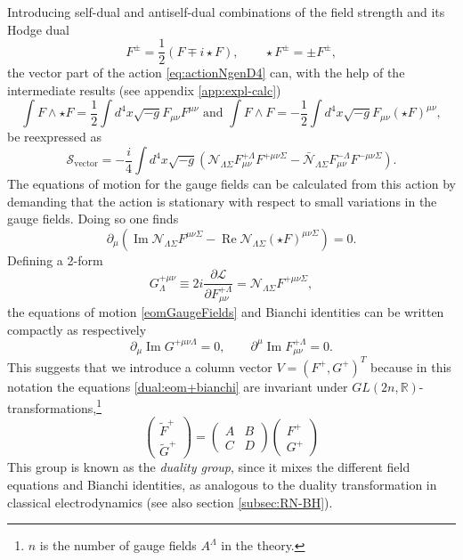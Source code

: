 \documentclass[12pt,twoside]{book}
\newcommand\real{\operatorname{Re}}
\newcommand\imag{\operatorname{Im}}
\begin{document}
Introducing self-dual and antiself-dual combinations of the field strength and its Hodge dual
\begin{equation}
F^{\pm}=\frac{1}{2}(F\mp i\star F),\qquad \star F^{\pm} = \pm F^{\pm},
\end{equation}
the vector part of the action \eqref{eq:actionNgenD4} can, with the help of the intermediate results (see appendix \ref{app:expl-calc})
\begin{equation}
\int  F\wedge\star F=\frac{1}{2}\int d^{4}x\sqrt{-g}F_{\mu\nu}F^{\mu\nu}\text{ and }\int F\wedge F = -\frac{1}{2}\int d^{4}x\sqrt{-g}F_{\mu\nu}\left(\star F\right)^{\mu\nu},
\end{equation}
be reexpressed as
\begin{equation}
\mathcal{S}_{\mathrm{vector}} = -\frac{i}{4}\int d^{4}x\sqrt{-g} \left( \mathcal{N}_{\Lambda\Sigma}F^{+\Lambda}_{\mu\nu}F^{+\mu\nu\Sigma} - \bar{\mathcal{N}}_{\Lambda\Sigma}F^{-\Lambda}_{\mu\nu}F^{-\mu\nu\Sigma}\right).
\end{equation}
The equations of motion for the gauge fields can be calculated from this action by demanding that the action is stationary with respect to small variations in the gauge fields. Doing so one finds
\begin{equation}\label{eomGaugeFields}
\partial_{\mu}\left(\imag \mathcal{N}_{\Lambda\Sigma}F^{\mu\nu\Sigma}-\real\mathcal{N}_{\Lambda\Sigma}(\star F)^{\mu\nu\Sigma}\right)=0.
\end{equation}
Defining a 2-form
\begin{equation}\label{defGdual}
G^{+\mu\nu}_{\Lambda}\equiv 2i\frac{\partial \mathcal{L}}{\partial F^{+\Lambda}_{\mu\nu}}=\mathcal{N}_{\Lambda\Sigma}F^{+\mu\nu\Sigma},
\end{equation}the equations of motion \eqref{eomGaugeFields} and Bianchi identities can be written compactly as respectively
\begin{equation}\label{dual:eom+bianchi}
\partial_{\mu}\imag G^{+\mu\nu \Lambda}=0,\qquad \partial^{\mu}\imag F^{+\Lambda}_{\mu\nu}=0.
\end{equation}
This suggests that we introduce a column vector $V=(F^{+},G^{+})^{T}$ because in this notation the equations \eqref{dual:eom+bianchi} are invariant under $GL(2n,\mathbb{R})$-transformations,\footnote{$n$ is the number of gauge fields $A^{\Lambda}$ in the theory.}
\begin{equation}\label{generalDuality}
\begin{pmatrix}
\tilde{F}^{+}\\ \tilde{G}^{+}\end{pmatrix}
=\begin{pmatrix}
A &B\\ C & D\end{pmatrix}
\begin{pmatrix}
F^{+}\\G^{+}\end{pmatrix}
\end{equation}
This group is known as the \emph{duality group}, since it mixes the different field equations and Bianchi identities, as analogous to the duality transformation in classical electrodynamics (see also section \ref{subsec:RN-BH}).
\end{document}
